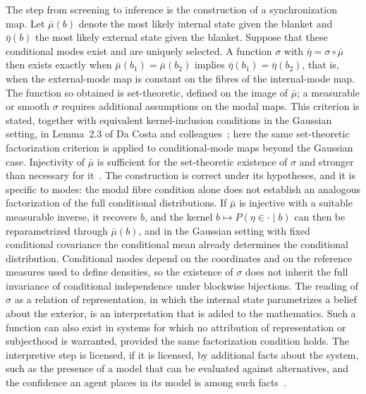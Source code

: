\documentclass[11pt]{article}
\theoremstyle{definition}
\begin{document}
The step from screening to inference is the construction of a synchronization map. Let $\bar\mu(b)$ denote the most likely internal state given the blanket and $\bar\eta(b)$ the most likely external state given the blanket. Suppose that these conditional modes exist and are uniquely selected. A function $\sigma$ with $\bar\eta=\sigma\circ\bar\mu$ then exists exactly when $\bar\mu(b_1)=\bar\mu(b_2)$ implies $\bar\eta(b_1)=\bar\eta(b_2)$, that is, when the external-mode map is constant on the fibres of the internal-mode map. The function so obtained is set-theoretic, defined on the image of $\bar\mu$; a measurable or smooth $\sigma$ requires additional assumptions on the modal maps. This criterion is stated, together with equivalent kernel-inclusion conditions in the Gaussian setting, in Lemma~2.3 of Da Costa and colleagues~\cite{dacosta2021}; here the same set-theoretic factorization criterion is applied to conditional-mode maps beyond the Gaussian case. Injectivity of $\bar\mu$ is sufficient for the set-theoretic existence of $\sigma$ and stronger than necessary for it~\cite{parr2020}. The construction is correct under its hypotheses, and it is specific to modes: the modal fibre condition alone does not establish an analogous factorization of the full conditional distributions. If $\bar\mu$ is injective with a suitable measurable inverse, it recovers $b$, and the kernel $b\mapsto P(\eta\in\cdot\mid b)$ can then be reparametrized through $\bar\mu(b)$, and in the Gaussian setting with fixed conditional covariance the conditional mean already determines the conditional distribution. Conditional modes depend on the coordinates and on the reference measures used to define densities, so the existence of $\sigma$ does not inherit the full invariance of conditional independence under blockwise bijections. The reading of $\sigma$ as a relation of representation, in which the internal state parametrizes a belief about the exterior, is an interpretation that is added to the mathematics. Such a function can also exist in systems for which no attribution of representation or subjecthood is warranted, provided the same factorization condition holds. The interpretive step is licensed, if it is licensed, by additional facts about the system, such as the presence of a model that can be evaluated against alternatives, and the confidence an agent places in its model is among such facts~\cite{solms2021}.
\end{document}
